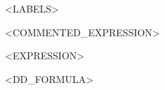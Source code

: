 \documentclass{article}
\begin{document}



<LABELS>

%
\newcommand\DDB[2]{\DDbox{#1}{8ex}{4ex}{#2}}
\newcommand\DDBB[2]{\DDbox{#1}{10ex}{6ex}{#2}}
\newcommand\DDBBB[2]{\DDbox{#1}{12ex}{6ex}{#2}}
\newcommand\DDBBBB[2]{\DDbox{#1}{14ex}{6ex}{#2}}


<COMMENTED_EXPRESSION>

<EXPRESSION>

<DD_FORMULA>

\writeDDlabels[4.3ex]
\end{document}
